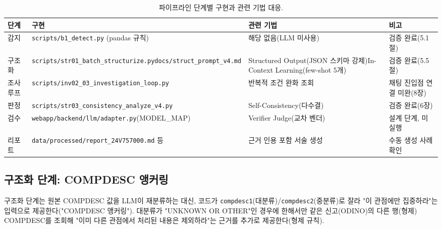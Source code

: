 \documentclass[11pt]{article}
\begin{document}
\begin{table}[H]
\centering
\footnotesize
\begin{tabular}{lp{4.3cm}p{3.5cm}p{2.6cm}}
\toprule
단계 & 구현 & 관련 기법 & 비고 \\
\midrule
감지 & \texttt{scripts/b1\_detect.py} (pandas 규칙) & 해당 없음(LLM 미사용) & 검증 완료(5.1절) \\
구조화 & \texttt{scripts/str01\_batch\_structurize.py}\newline\texttt{docs/struct\_prompt\_v4.md} & Structured Output(JSON 스키마 강제)\newline In-Context Learning(few-shot 5개) & 검증 완료(5.5절) \\
조사 루프 & \texttt{scripts/inv02\_03\_investigation\_loop.py} & 반복적 조건 완화 조회 & 채팅 진입점 연결 미완(8장) \\
판정 & \texttt{scripts/str03\_consistency\_analyze\_v4.py} & Self-Consistency(다수결) & 검증 완료(6장) \\
검수 & \texttt{webapp/backend/llm/adapter.py}\newline(MODEL\_MAP) & Verifier Judge(교차 벤더) & 설계 단계, 미실행 \\
리포트 & \texttt{data/processed/report\_24V757000.md} 등 & 근거 인용 포함 서술 생성 & 수동 생성 사례 확인 \\
\bottomrule
\end{tabular}
\caption{파이프라인 단계별 구현과 관련 기법 대응.}
\label{tab:pipeline}
\end{table}

\subsection{구조화 단계: COMPDESC 앵커링}

구조화 단계는 원본 COMPDESC 값을 LLM이 재분류하는 대신, 코드가 \texttt{compdesc1}(대분류)/\texttt{compdesc2}(중분류)로 잘라 "이 관점에만 집중하라"는 입력으로 제공한다("COMPDESC 앵커링"). 대분류가 "UNKNOWN OR OTHER"인 경우에 한해서만 같은 신고(ODINO)의 다른 행(형제) COMPDESC를 조회해 "이미 다른 관점에서 처리된 내용은 제외하라"는 근거를 추가로 제공한다(형제 규칙).
\end{document}
